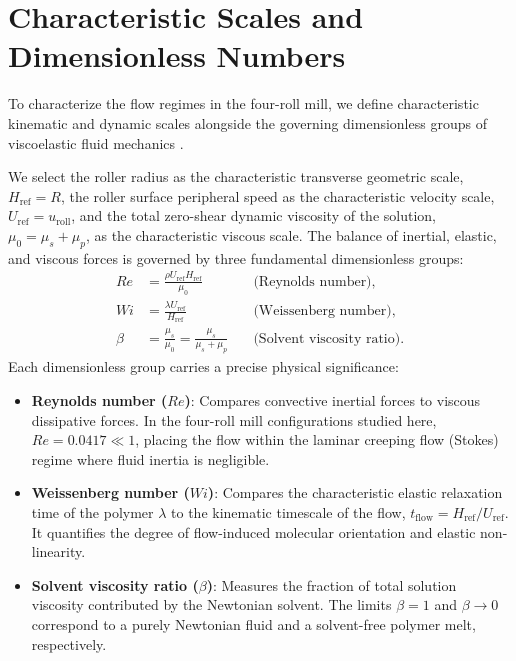 \clearpage
\section{Characteristic Scales and Dimensionless Numbers}
\label{sec:nondimensionalization}

To characterize the flow regimes in the four-roll mill, we define characteristic kinematic
and dynamic scales alongside the governing dimensionless groups of viscoelastic fluid
mechanics \cite{bird1987dynamics, owens2002computational}.

\label{subsec:reference_scales}
We select the roller radius as the characteristic transverse geometric scale,
$H_{\mathrm{ref}} = R$, the roller surface peripheral speed as the characteristic
velocity scale, $U_{\mathrm{ref}} = u_{\mathrm{roll}}$, and the total zero-shear dynamic
viscosity of the solution, $\mu_0 = \mu_s + \mu_p$, as the characteristic viscous scale.
The balance of inertial, elastic, and viscous forces is governed by three fundamental
dimensionless groups:
\begin{align}
    Re &= \frac{\rho U_{\mathrm{ref}} H_{\mathrm{ref}}}{\mu_0} \quad &\text{(Reynolds number)}, \label{eq:reynolds_def} \\
    Wi &= \frac{\lambda U_{\mathrm{ref}}}{H_{\mathrm{ref}}} \quad &\text{(Weissenberg number)}, \label{eq:weissenberg_def} \\
    \beta &= \frac{\mu_s}{\mu_0} = \frac{\mu_s}{\mu_s + \mu_p} \quad &\text{(Solvent viscosity ratio)} . \label{eq:viscosity_ratio_def}
\end{align}
Each dimensionless group carries a precise physical significance:
\begin{itemize}[noitemsep, topsep=3pt, parsep=1pt]
    \item \textbf{Reynolds number ($Re$)}: Compares convective inertial forces to viscous
    dissipative forces. In the four-roll mill configurations studied here, $Re = 0.0417 \ll 1$,
    placing the flow within the laminar creeping flow (Stokes) regime where fluid
    inertia is negligible.
    \item \textbf{Weissenberg number ($Wi$)}: Compares the characteristic elastic relaxation
    time of the polymer $\lambda$ to the kinematic timescale of the flow,
    $t_{\mathrm{flow}} = H_{\mathrm{ref}}/U_{\mathrm{ref}}$. It quantifies the degree of
    flow-induced molecular orientation and elastic non-linearity.
    \item \textbf{Solvent viscosity ratio ($\beta$)}: Measures the fraction of total solution
    viscosity contributed by the Newtonian solvent. The limits $\beta = 1$ and $\beta \to 0$
    correspond to a purely Newtonian fluid and a solvent-free polymer melt, respectively.
\end{itemize}

